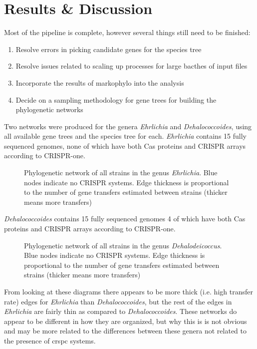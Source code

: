 \section*{\huge Results \& Discussion}
Most of the pipeline is complete, however several things still need to be finished:
\begin{enumerate}
    \item Resolve errors in picking candidate genes for the species tree
    \item Resolve issues related to scaling up processes for large bacthes of input files
    \item Incorporate the results of markophylo into the analysis
    \item Decide on a sampling methodology for gene trees for building the phylogenetic networks
\end{enumerate}
Two networks were produced for the genera \textit{Ehrlichia} and \textit{Dehalococcoides}, using all available gene trees and the species tree for each.
\textit{Ehrlichia} contains 15 fully sequenced genomes, none of which have both Cas proteins and CRISPR arrays according to CRISPR-one.
\begin{figure}[htb!]
    \caption{Phylogenetic network of all strains in the genus \textit{Ehrlichia}. Blue nodes indicate no CRISPR systems. Edge thickness is proportional to the number of gene transfers estimated between strains (thicker means more transfers)}
\end{figure}
\FloatBarrier
\textit{Dehalococcoides} contains 15 fully sequenced genomes 4 of which have both Cas proteins and CRISPR arrays according to CRISPR-one.
\begin{figure}[htb!]
    \caption{Phylogenetic network of all strains in the genus \textit{Dehalodeicoccus}. Blue nodes indicate no CRISPR systems. Edge thickness is proportional to the number of gene transfers estimated between strains (thicker means more transfers)}
\end{figure}
\FloatBarrier
From looking at these diagrams there appears to be more thick (i.e. high transfer rate) edges for \textit{Ehrlichia} than \textit{Dehalococcoides}, but the rest of the edges in \textit{Ehrlichia} are fairly thin as compared to \textit{Dehalococcoides}.
These networks do appear to be different in how they are organized, but why this is is not obvious and may be more related to the differences between these genera not related to the presence of \ac{crspc} systems.
